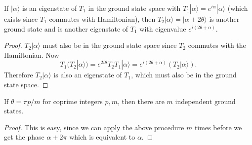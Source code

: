 \begin{proposition}
  If $| \alpha \rangle$ is an eigenstate of $T_1$ in the ground state space with $T_1 | \alpha \rangle = e^{i \alpha} | \alpha \rangle$ (which exists since $T_1$ commutes with Hamiltonian), then $T_2 | \alpha \rangle = | \alpha + 2 \theta \rangle$  is another ground state and is another eigenstate of $T_1$ with eigenvalue $e^{i (2 \theta + \alpha)}$.
\end{proposition}


\begin{proof}
  $T_2 |  \alpha \rangle$ must also be in the ground state space since $T_2$ commutes with the Hamiltonian.  Now $$
  T_1 (T_2 | \alpha \rangle) = e^{2 i \theta} T_2 T_1 |  \alpha \rangle = e^{i(2 \theta + \alpha)} (T_2 |  \alpha \rangle)
  .$$
  Therefore $T_2 |  \alpha \rangle$ is also an eigenstate of $T_1$, which must also be in the ground state space.   
\end{proof}

\begin{corollary}
  If $\theta = \pi p / m$ for coprime integers $p, m$, then there are $m$ independent ground states.
\end{corollary}


\begin{proof}
  This is easy, since we can apply the above procedure $m$ times before we get the phase $\alpha + 2 \pi$ which is equivalent to $\alpha$.   
\end{proof}


